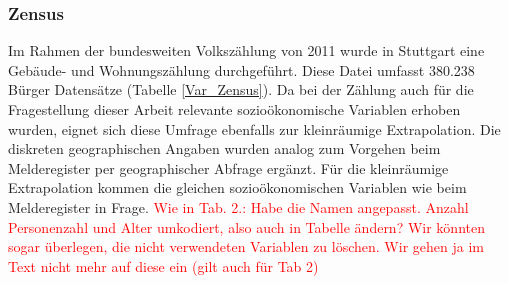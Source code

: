 \documentclass{Vorlage}
\begin{document}
\begin{table}[h]
\centering
\caption{Sozioökonomische und geographische Variablen des Melderegisters und deren Anzahl der Ausprägungen.}
\label{Var_Buergerumfrage}
\end{table}

\subsubsection{Zensus}
Im Rahmen der bundesweiten Volkszählung von 2011 wurde in Stuttgart eine Gebäude- und Wohnungszählung durchgeführt. Diese Datei umfasst 380.238 Bürger Datensätze (Tabelle \ref{Var_Zensus}). Da bei der Zählung auch für die Fragestellung dieser Arbeit relevante sozioökonomische Variablen 
erhoben wurden, eignet sich diese Umfrage ebenfalls zur kleinräumige Extrapolation. Die diskreten geographischen 
Angaben wurden analog zum Vorgehen beim Melderegister per geographischer Abfrage ergänzt. Für die kleinräumige Extrapolation kommen 
die gleichen sozioökonomischen Variablen wie beim Melderegister in Frage. 
\textcolor{red}{Wie in Tab. 2.: Habe die Namen angepasst. Anzahl Personenzahl und Alter umkodiert, also auch in Tabelle 
ändern? Wir könnten sogar überlegen, die nicht verwendeten Variablen zu löschen. Wir gehen ja im Text nicht mehr auf 
diese ein (gilt auch für Tab 2)}
\end{document}

